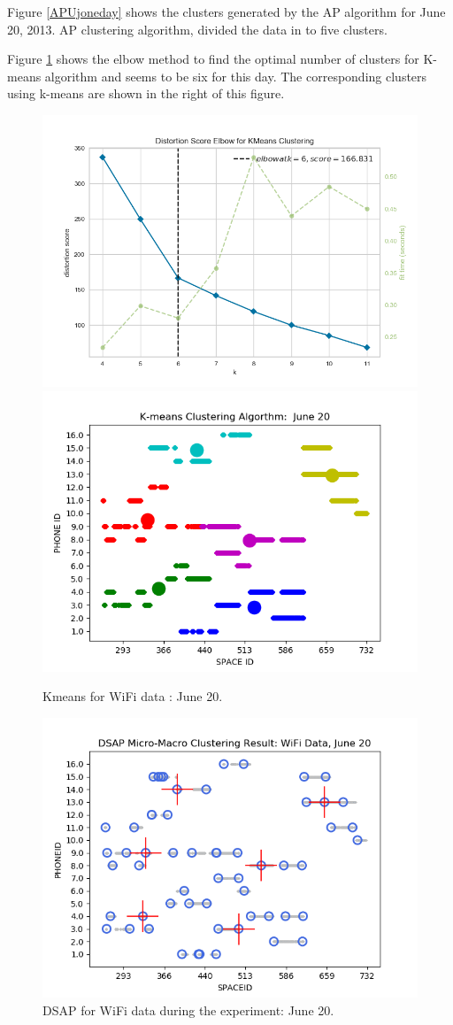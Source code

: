 \documentclass[../UNBThesis2.tex]{subfiles}
\begin{document}
Figure \ref{APUjoneday} shows the clusters generated by the AP algorithm for June 20, 2013. AP clustering algorithm, divided the data in to five clusters.


Figure \ref{elbowkwifi} shows the elbow method to find the optimal number of clusters for K-means algorithm and seems to be six for this day. The corresponding clusters using k-means are shown in the right of this figure. %


\begin{figure}[!h]
    \centering
    \includegraphics[width = 7.5 cm]{image/Chapters/Chapter6/elbowDay20.png}\hfill
     \includegraphics[width = 7.5 cm]{image/Chapters/Chapter6/kmeansJun20.png}
    \\[\smallskipamount]    
    \caption{Kmeans for WiFi data : June 20.}
    \label{elbowkwifi}
\end{figure}







\begin{figure}[!h]
    \centering
    \includegraphics[width = 10 cm]{image/Chapters/Chapter6/DSAPJune20.png}
    \caption{ DSAP for WiFi data during the experiment: June 20.}
    \label{3}
\end{figure}
\end{document}
